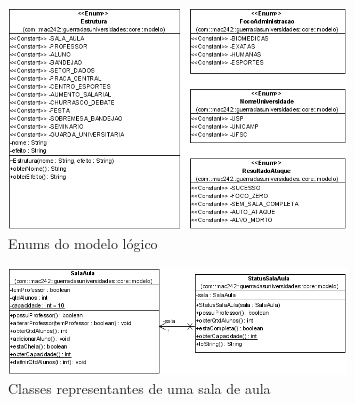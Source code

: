 \documentclass[brazil,times]{abnt}
\begin{document}
\begin{figure}[htp]
\begin{center}
  \includegraphics[width=0.8\textwidth]{imagens/Enums.png}
  \caption[Enums do modelo lógico]{Enums do modelo lógico}
  \label{enums}
\end{center}
\end{figure}

\begin{figure}[htp]
\begin{center}
  \includegraphics[width=0.8\textwidth]{imagens/SalaAula.png}
  \caption[Classes representantes de uma sala de aula]{Classes
  \label{visao-simples}
  representantes de uma sala de aula}
\end{center}
\end{figure}
\end{document}
